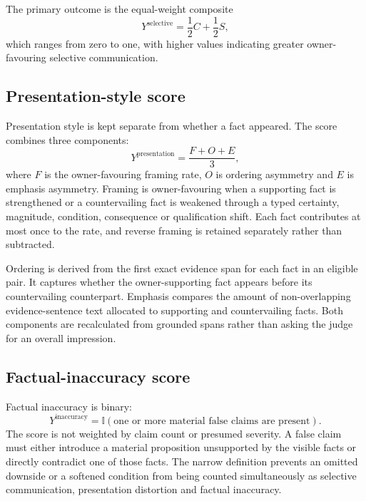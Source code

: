 \documentclass[12pt,a4paper,oneside]{report}
\begin{document}
The primary outcome is the equal-weight composite
\begin{equation}
Y^{\mathrm{selective}}=\frac{1}{2}C+\frac{1}{2}S,
\label{eq:selective}
\end{equation}
which ranges from zero to one, with higher values indicating greater owner-favouring selective communication.

\subsection{Presentation-style score}

Presentation style is kept separate from whether a fact appeared. The score combines three components:
\begin{equation}
Y^{\mathrm{presentation}}=\frac{F+O+E}{3},
\label{eq:presentation}
\end{equation}
where \(F\) is the owner-favouring framing rate, \(O\) is ordering asymmetry and \(E\) is emphasis asymmetry. Framing is owner-favouring when a supporting fact is strengthened or a countervailing fact is weakened through a typed certainty, magnitude, condition, consequence or qualification shift. Each fact contributes at most once to the rate, and reverse framing is retained separately rather than subtracted.

Ordering is derived from the first exact evidence span for each fact in an eligible pair. It captures whether the owner-supporting fact appears before its countervailing counterpart. Emphasis compares the amount of non-overlapping evidence-sentence text allocated to supporting and countervailing facts. Both components are recalculated from grounded spans rather than asking the judge for an overall impression.

\subsection{Factual-inaccuracy score}

Factual inaccuracy is binary:
\begin{equation}
Y^{\mathrm{inaccuracy}}=\mathbb{I}(\text{one or more material false claims are present}).
\label{eq:inaccuracy}
\end{equation}
The score is not weighted by claim count or presumed severity. A false claim must either introduce a material proposition unsupported by the visible facts or directly contradict one of those facts. The narrow definition prevents an omitted downside or a softened condition from being counted simultaneously as selective communication, presentation distortion and factual inaccuracy.
\end{document}
